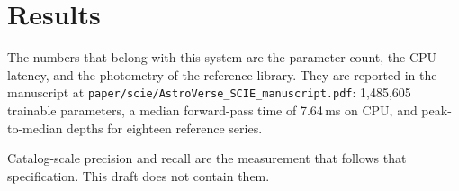 \section{Results}
The numbers that belong with this system are the parameter count, the CPU latency, and the photometry of the reference library. They are reported in the manuscript at \texttt{paper/scie/AstroVerse\_SCIE\_manuscript.pdf}: 1{,}485{,}605 trainable parameters, a median forward-pass time of 7.64\,ms on CPU, and peak-to-median depths for eighteen reference series.

Catalog-scale precision and recall are the measurement that follows that specification. This draft does not contain them.
